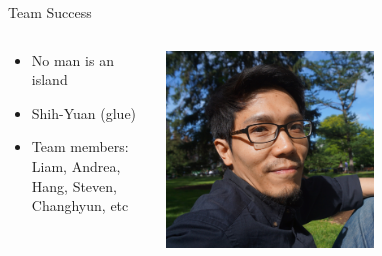 \documentclass[aspectratio=43]{beamer}
\begin{document}

\begin{frame}{Team Success}
\begin{columns}
	\begin{column}{0.55\textwidth}
		\begin{itemize}
			\item No man is an island
			\item \alert{Shih-Yuan} (glue)
\item Team members: Liam, Andrea, Hang, Steven, Changhyun, etc
		\end{itemize}
	\end{column}
	\begin{column}{0.45\textwidth}
		\centering
		\includegraphics[width=0.6\textwidth]{fig/liu.jpg}
	\end{column}
\end{columns}

\end{frame}
\end{document}
